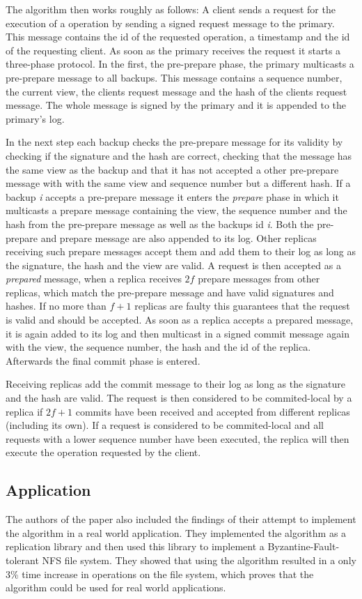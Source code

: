 The algorithm then works roughly as follows: A client sends a request for the execution of a operation by sending a signed request message to the primary. This message contains
the id of the requested operation, a timestamp and the id of the requesting client. As soon as the primary receives the request it starts a three-phase protocol.
In the first, the pre-prepare phase, the primary multicasts a pre-prepare message to all backups. This message contains a sequence number, the current view, the clients request message
and the hash of the clients request message. The whole message is signed by the primary and it is appended to the primary's log.

In the next step each backup checks the pre-prepare message for its validity by checking if the signature and the hash are correct, checking that the message has the same view as the backup and
that it has not accepted a other pre-prepare message with with the same view and sequence number but a different hash. If a backup \textit{i} accepts a pre-prepare message it enters the \textit{prepare}
phase in which it multicasts a prepare message containing the view, the sequence number and the hash from the pre-prepare message as well as the backups id \textit{i}. Both the pre-prepare and
prepare message are also appended to its log. Other replicas receiving such prepare messages accept them and add them to their log as long as the signature, the hash and the view are
valid. A request is then accepted as a \textit{prepared} message, when a replica receives $2f$ prepare messages from other replicas, which match the pre-prepare message and have valid signatures
and hashes. If no more than $f+1$ replicas are faulty this guarantees that the request is valid and should be accepted. As soon as a replica accepts a prepared message, it is again added to its log
and then multicast in a signed commit message again with the view, the sequence number, the hash and the id of the replica. Afterwards the final commit phase is entered.

Receiving replicas add the commit
message to their log as long as the signature and the hash are valid. The request is then considered to be commited-local by a replica if $2f+1$ commits have been received and accepted from
different replicas (including its own). If a request is considered to be commited-local and all requests with a lower sequence number have been executed, the replica will then execute the operation
requested by the client.

\subsection{Application}

The authors of the paper also included the findings of their attempt to implement the algorithm in a real world application. They implemented the algorithm as a replication library and then used this
library to implement a Byzantine-Fault-tolerant NFS file system. They showed that using the algorithm resulted in a only 3\% time increase in operations on the file system, which proves
that the algorithm could be used for real world applications. 
